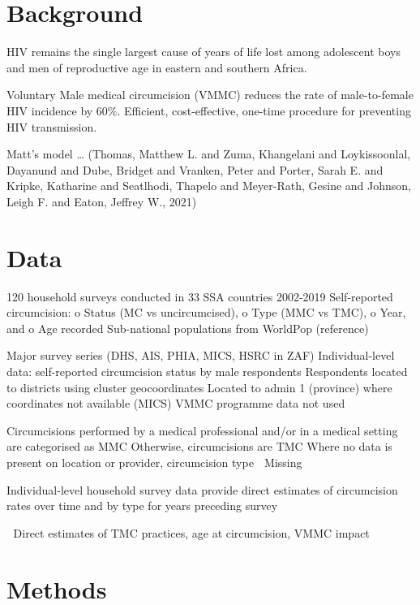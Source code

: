 \documentclass[a4paper, 12pt]{article}
\begin{document}
\newpage

\section{Background}
\label{sec:org3a33a7d}

HIV remains the single largest cause of years of life lost among adolescent boys and men of reproductive age in eastern and southern Africa.

Voluntary Male medical circumcision (VMMC) reduces the rate of male-to-female HIV incidence by 60\%.
Efficient, cost-effective, one-time procedure for preventing HIV transmission.

Matt's model \ldots{} (Thomas, Matthew L. and Zuma, Khangelani and Loykissoonlal, Dayanund and Dube, Bridget and Vranken, Peter and Porter, Sarah E. and Kripke, Katharine and Seatlhodi, Thapelo and Meyer-Rath, Gesine and Johnson, Leigh F. and Eaton, Jeffrey W., 2021)

\newpage
\section{Data}
\label{sec:org0422724}

120 household surveys conducted in 33 SSA countries 2002-2019
Self-reported circumcision:
o Status (MC vs uncircumcised), 
o Type (MMC vs TMC), 
o Year, and
o Age 
recorded
Sub-national populations from WorldPop (reference)

Major survey series (DHS, AIS, PHIA, MICS, HSRC in ZAF)
Individual-level data: self-reported circumcision status  by male respondents
Respondents located to districts using cluster geocoordinates
Located to admin 1 (province) where coordinates not available (MICS)
VMMC programme data not used

Circumcisions performed by a medical professional and/or in a medical setting are categorised as MMC
Otherwise, circumcisions are TMC
Where no data is present on location or provider, circumcision type  Missing

Individual-level household survey data provide direct estimates of circumcision rates over time and by type for years preceding survey

 Direct estimates of TMC practices, age at circumcision, VMMC impact



\newpage

\section{Methods}
\label{sec:org69a085f}
\end{document}
